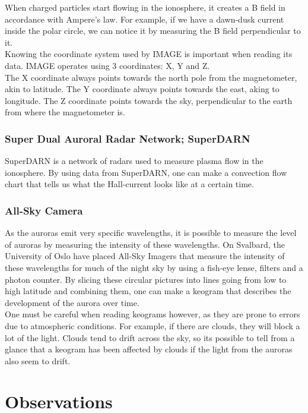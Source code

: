 \documentclass[norsk,a4paper,12pt]{article}
\begin{document}
When charged particles start flowing in the ionosphere, it creates a B field in accordance with Ampere's law. For example, if we have a dawn-dusk current inside the polar circle, we can notice it by measuring the B field perpendicular to it.\\
Knowing the coordinate system used by IMAGE is important when reading its data. IMAGE operates using 3 coordinates: X, Y and Z.\\
The X coordinate always points towards the north pole from the magnetometer, akin to latitude. The Y coordinate always points towards the east, aking to longitude. The Z coordinate points towards the sky, perpendicular to the earth from where the magnetometer is.

\subsubsection{Super Dual Auroral Radar Network; SuperDARN}
SuperDARN is a network of radars used to measure plasma flow in the ionosphere. By using data from SuperDARN, one can make a convection flow chart that tells us what the Hall-current looks like at a certain time.

\subsubsection{All-Sky Camera}
As the auroras emit very specific wavelengths, it is possible to measure the level of auroras by measuring the intensity of these wavelengths. On Svalbard, the University of Oslo have placed All-Sky Imagers that measure the intensity of these wavelengths for much of the night sky by using a fish-eye lense, filters and a photon counter. By slicing these circular pictures into lines going from low to high latitude and combining them, one can make a keogram that describes the development of the aurora over time.\\
One must be careful when reading keograms however, as they are prone to errors due to atmospheric conditions. For example, if there are clouds, they will block a lot of the light. Clouds tend to drift across the sky, so its possible to tell from a glance that a keogram has been affected by clouds if the light from the auroras also seem to drift.


\section{Observations} %
\label{sec:observations}
\end{document}
